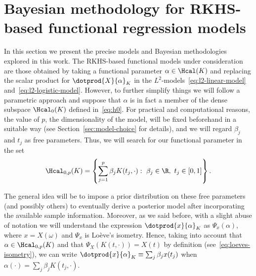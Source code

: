 %
%

\section{Bayesian methodology for RKHS-based functional regression models}\label{sec:methodology}

In this section we present the precise models and Bayesian methodologies explored in this work. The RKHS-based functional models under consideration \citep[see][]{berrendero2018functional, berrendero2019rkhs} are those obtained by taking a functional parameter \(\alpha \in \Hcal(K)\) and replacing the scalar product for \(\dotprod{X}{\alpha}_K\) in the \(L^2\)-models~\eqref{eq:l2-linear-model} and~\eqref{eq:l2-logistic-model}. However, to further simplify things we will follow a parametric approach and suppose that \(\alpha\) is in fact a member of the dense subspace \(\Hcal_0(K)\) defined in~\eqref{eq:h0}. For practical and computational reasons, the value of \(p\), the dimensionality of the model, will be fixed beforehand in a suitable way (see Section~\ref{sec:model-choice} for details), and we will regard \(\beta_j\) and \(t_j\) as free parameters. Thus, we will search for our functional parameter in the set
\begin{equation}\label{eq:h0p}
\Hcal_{0,p}(K)=\left\{ \sum_{j=1}^p \beta_j K(t_j, \cdot): \ \beta_j \in \R, \ t_j \in [0, 1]\right\}.
\end{equation}

The general idea will be to impose a prior distribution on these free parameters (and possibly others) to eventually derive a posterior model after incorporating the available sample information.  Moreover, as we said before, with a slight abuse of notation we will understand the expression \(\dotprod{x}{\alpha}_K\) as \(\Psi_x(\alpha)\), where \(x=X(\omega)\) and \(\Psi_x\) is Loève's isometry. Hence, taking into account that \(\alpha \in \Hcal_{0,p}(K)\) and that \(\Psi_X(K(t, \cdot)) = X(t)\) by definition (see~\eqref{eq:loeves-isometry}), we can write \(\dotprod{x}{\alpha}_K \equiv \sum_j \beta_j x(t_j)\) when \(\alpha(\cdot)=\sum_j\beta_j K(t_j, \cdot)\).

